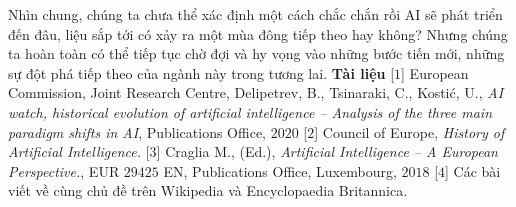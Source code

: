 \begin{multicols}{2}
	\vskip 0.1cm
	Nhìn chung, chúng ta chưa thể xác định một cách chắc chắn rồi AI sẽ phát triển đến đâu, liệu sắp tới có xảy ra một mùa đông tiếp
	theo hay không? Nhưng chúng ta hoàn toàn có thể tiếp tục chờ đợi và hy vọng vào những bước tiến mới, những sự đột phá tiếp theo của ngành này trong tương lai.  
	\vskip 0.1cm
	\textbf{\color{cackithi}Tài liệu}
	\vskip 0.1cm
	[$1$] European Commission, Joint Research Centre, Delipetrev, B., Tsinaraki, C., Kostić, U., \textit{AI watch, historical evolution of artificial intelligence -- Analysis of the three main paradigm shifts in AI}, Publications Office, $2020$
	\vskip 0.1cm
	[$2$] Council of Europe, \textit{History of Artificial Intelligence.}
	\vskip 0.1cm	
	[$3$] Craglia M., (Ed.), \textit{Artificial Intelligence -- A European Perspective.}, EUR $29425$ EN, Publications Office, Luxembourg, $2018$
	\vskip 0.1cm
	[$4$] Các bài viết về cùng chủ đề trên Wikipedia và Encyclopaedia Britannica.
\end{multicols}